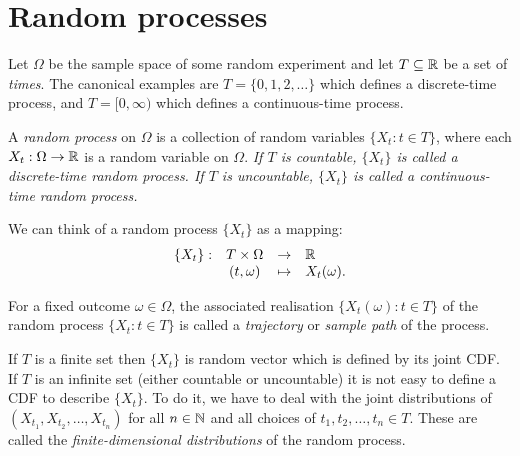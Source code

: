 \chapter{Random processes}\label{chap:randomprocesses}

\newcommand{\Znn}{\mathbb{Z}_{\geq 0}}

Let $\Omega$ be the sample space of some random experiment and let $T\subseteq\mathbb{R}$ be a set of \emph{times}. The canonical examples are $T=\{0,1,2,\ldots\}$ which defines a discrete-time process, and $T=[0,\infty)$ which defines a continuous-time process.

\begin{definition}
A \emph{random process} on $\Omega$ is a collection of random variables $\{X_t:t\in T\}$, where each $X_t:\Omega\to\mathbb{R}$ is a random variable on $\Omega$.
\ben
\it If $T$ is countable, $\{X_t\}$ is called a \emph{discrete-time} random process.
\it If $T$ is uncountable, $\{X_t\}$ is called a \emph{continuous-time} random process. 
\een
\end{definition}

We can think of a random process $\{X_t\}$ as a mapping:
\[
\begin{array}{rccl}
\{X_t\}: 	& T\times\Omega		& \to		& \mathbb{R} \\
			& (t,\omega)		& \mapsto	& X_t(\omega).
\end{array}
\]

\begin{definition}
For a fixed outcome $\omega\in\Omega$, the associated realisation $\{X_t(\omega):t\in T\}$ of the random process $\{X_t:t\in T\}$ is called a \emph{trajectory} or \emph{sample path} of the process. 
\end{definition}

If $T$ is a finite set then $\{X_t\}$ is random vector which is defined by its joint CDF. If $T$ is an infinite set (either countable or uncountable) it is not easy to define a CDF to describe $\{X_t\}$. To do it, we have to deal with the joint distributions of $(X_{t_1},X_{t_2},\ldots,X_{t_n})$ for all $n\in\mathbb{N}$ and all choices of $t_1,t_2,\ldots,t_n\in T$. These are called the \emph{finite-dimensional distributions} of the random process.

